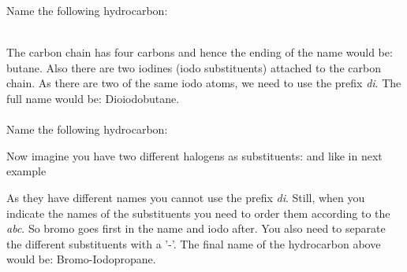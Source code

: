 \documentclass[main.tex]{subfiles}
\begin{document}
\begin{description}
\begin{example} %
Name the following hydrocarbon:
\begin{center} \end{center}
\\
The carbon chain has four carbons and hence the ending of the name would be: butane. Also there are two iodines (iodo substituents) attached to the carbon chain. As there are two of the same iodo atoms, we need to use the prefix \emph{di}. The full name would be: Dioiodobutane.
\\
\faDiamond\ \\
Name the following hydrocarbon:
\begin{center} \end{center}
\end{example}%



\item[\docfilehook{  Alkanes with different substituents}{Alkanes with different substituents}] 
Now imagine you have two different halogens as substituents:  and  like in next example

\begin{center} \end{center}
As they have different names you cannot use the prefix \emph{di}. Still, when you indicate the names of the substituents you need to order them according to the \emph{abc}. So bromo goes first in the name and iodo after. You also need to separate the different substituents with a '-'. The final name of the hydrocarbon above would be: Bromo-Iodopropane.




\end{description}
\end{document}
